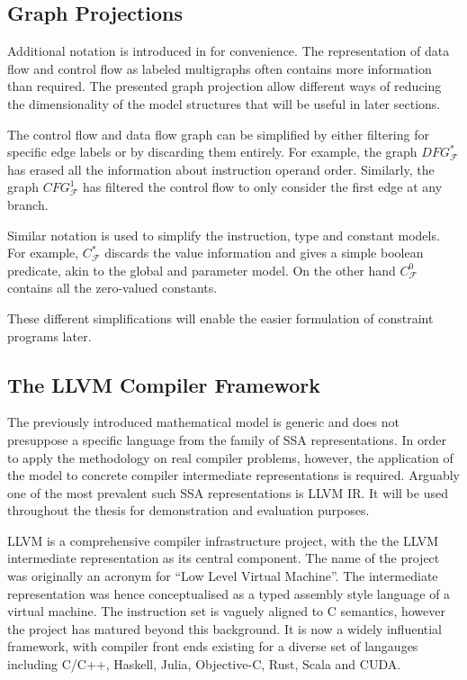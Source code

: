 \subsection{Graph Projections}

    Additional notation is introduced in  for
    convenience.
    The representation of data flow and control flow as labeled multigraphs
    often contains more information than required.
    The presented graph projection allow different ways of reducing the
    dimensionality of the model structures that will be useful in later
    sections.

    The control flow and data flow graph can be simplified by either filtering
    for specific edge labels or by discarding them entirely.
    For example, the graph $DFG_\mathcal F^*$ has erased all the information
    about instruction operand order.
    Similarly, the graph $CFG_\mathcal F^1$ has filtered the control flow to
    only consider the first edge at any branch.

    Similar notation is used to simplify the instruction, type and constant
    models.
    For example, $C_\mathcal F^*$ discards the value information and gives a
    simple boolean predicate, akin to the global and parameter model.
    On the other hand $C_\mathcal F^0$ contains all the zero-valued constants.

    These different simplifications will enable the easier formulation of
    constraint programs later.

\subsection{The LLVM Compiler Framework}

    The previously introduced mathematical model is generic and does not
    presuppose a specific language from the family of SSA representations.
    In order to apply the methodology on real compiler problems, however, the
    application of the model to concrete compiler intermediate representations
    is required.
    Arguably one of the most prevalent such SSA representations is LLVM IR.
    It will be used throughout the thesis for demonstration and evaluation
    purposes.

    LLVM is a comprehensive compiler infrastructure project, with the the LLVM
    intermediate representation as its central component.
    The name of the project was originally an acronym for
    ``Low Level Virtual Machine''.
    The intermediate representation was hence conceptualised as a typed assembly
    style language of a virtual machine.
    The instruction set is vaguely aligned to C semantics, however the project
    has matured beyond this background.
    It is now a widely influential framework, with compiler front ends existing
    for a diverse set of langauges including C/C++, Haskell, Julia, Objective-C,
    Rust, Scala and CUDA.

